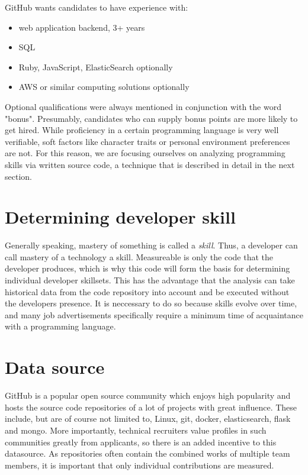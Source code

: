 GitHub wants candidates to have experience with:
\begin{itemize}
    \item web application backend, 3+ years
    \item SQL
    \item Ruby, JavaScript, ElasticSearch optionally
    \item AWS or similar computing solutions optionally
\end{itemize}

Optional qualifications were always mentioned in conjunction with the word "bonus". Presumably, candidates who can supply bonus points are more likely to get hired. While proficiency in a certain programming language is very well verifiable, soft factors like character traits or personal environment preferences are not. For this reason, we are focusing ourselves on analyzing programming skills via written source code, a technique that is described in detail in the next section.

\section{Determining developer skill}
Generally speaking, mastery of something is called a \textit{skill}. Thus, a developer can call mastery of a technology a skill. Measureable is only the code that the developer produces, which is why this code will form the basis for determining individual developer skillsets. This has the advantage that the analysis can take historical data from the code repository into account and be executed without the developers presence. It is neccessary to do so because skills evolve over time, and many job advertisements specifically require a minimum time of acquaintance with a programming language.

\section{Data source}
GitHub is a popular open source community which enjoys high popularity
and hosts the source code repositories of a lot of projects with great influence. These include, but are of course not limited to, Linux, git, docker, elasticsearch, flask and mongo\cite{rpfd:2014}. More importantly, technical recruiters value profiles in such communities greatly from applicants\cite{md:2013}, so there is an added incentive to this datasource. As repositories often contain the combined works of multiple team members, it is important that only individual contributions are measured.

